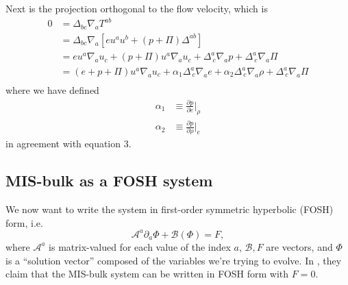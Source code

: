 \documentclass[12pt]{article}
\numberwithin{equation}{section}
\begin{document}
Next is the projection orthogonal to the flow velocity, which is
\begin{equation}
\begin{aligned}
0 &= \Delta_{bc} \nabla_{a} T^{ab} \\
&= \Delta_{bc} \nabla_{a} [e u^a u^b + (p + \Pi) \Delta^{ab}] \\
&= e u^a \nabla_{a} u_c + (p + \Pi) u^a \nabla_{a} u_c + \Delta^{a}_{~c} \nabla_{a} p + \Delta^{a}_{~c} \nabla_{a} \Pi \\
&= (e + p + \Pi) u^a \nabla_{a} u_c + \alpha_1 \Delta^{a}_{~c} \nabla_a e + \alpha_2 \Delta^{a}_{~c} \nabla_a \rho + \Delta^{a}_{~c} \nabla_{a} \Pi \\
\end{aligned}
\end{equation}
where we have defined
\begin{align}
\alpha_1 &\equiv \frac{\partial p}{\partial e} \Big|_\rho \\
\alpha_2 &\equiv \frac{\partial p}{\partial \rho} \Big|_e
\end{align}
in agreement with \cite{Bemfica19} equation 3.

\subsection{MIS-bulk as a FOSH system}

We now want to write the system in first-order symmetric hyperbolic (FOSH) form, i.e.
\begin{equation}
\mathcal{A}^{a} \partial_{a} \Phi + \mathcal{B}(\Phi) = F,
\end{equation}
where $\mathcal{A}^{a}$ is matrix-valued for each value of the index $a$, $\mathcal{B}, F$ are vectors, and $\Phi$ is a ``solution vector'' composed of the variables we're trying to evolve.
In \cite{Bemfica19}, they claim that the MIS-bulk system can be written in FOSH form with $F = 0$.
\end{document}
